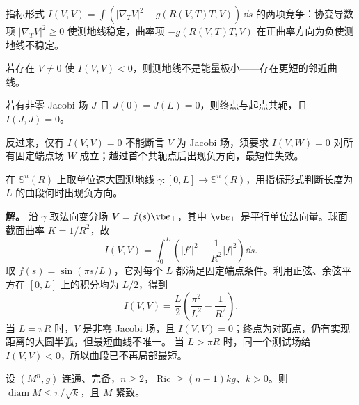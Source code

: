 指标形式 $I(V,V)=\int(|\nabla_TV|^2-g(R(V,T)T,V))\,\dd s$ 的两项竞争：协变导数项 $|\nabla_TV|^2\ge0$ 使测地线稳定，曲率项 $-g(R(V,T)T,V)$ 在正曲率方向为负使测地线不稳定。

若存在 $V\neq0$ 使 $I(V,V)<0$，则测地线不是能量极小——存在更短的邻近曲线。

若有非零 Jacobi 场 $J$ 且 $J(0)=J(L)=0$，则终点与起点共轭，且 $I(J,J)=0$。

反过来，仅有 $I(V,V)=0$ 不能断言 $V$ 为 Jacobi 场，须要求 $I(V,W)=0$ 对所有固定端点场 $W$ 成立；越过首个共轭点后出现负方向，最短性失效。

\begin{exbox}[球面测地线越过对跖点后为何失去最短性]
在 $\mathbb S^n(R)$ 上取单位速大圆测地线 $\gamma:[0,L]\to\mathbb S^n(R)$，用指标形式判断长度为 $L$ 的曲段何时出现负方向。

\textbf{解。} 沿 $\gamma$ 取法向变分场 $V=f(s)\vb e_\perp$，其中 $\vb e_\perp$ 是平行单位法向量。球面截面曲率 $K=1/R^2$，故
\[
 I(V,V)=\int_0^L\!\left(|f'|^2-\frac{1}{R^2}|f|^2\right)\dd s.
\]
取 $f(s)=\sin(\pi s/L)$，它对每个 $L$ 都满足固定端点条件。利用正弦、余弦平方在 $[0,L]$ 上的积分均为 $L/2$，得到
\[
I(V,V)=\frac L2\left(\frac{\pi^2}{L^2}-\frac1{R^2}\right).
\]
当 $L=\pi R$ 时，$V$ 是非零 Jacobi 场，且 $I(V,V)=0$；终点为对跖点，仍有实现距离的大圆半弧，但最短曲线不唯一。
当 $L>\pi R$ 时，同一个测试场给 $I(V,V)<0$，所以曲段已不再局部最短。
\end{exbox}

\begin{theorem}
设 $(M^n,g)$ 连通、完备，$n\ge2$，$\operatorname{Ric}\ge(n-1)kg$、$k>0$。则 $\operatorname{diam}M\le\pi/\sqrt k$，且 $M$ 紧致。
\end{theorem}

